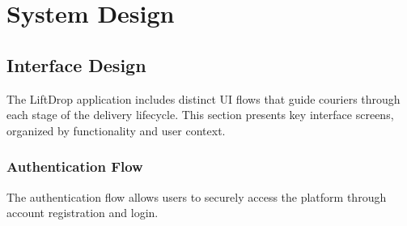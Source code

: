 \section{System Design}



\vspace{2mm}

\subsection{Interface Design}

The LiftDrop application includes distinct UI flows that guide couriers through each stage of the delivery lifecycle. This section presents key interface screens, organized by functionality and user context.


\subsubsection{Authentication Flow}

The authentication flow allows users to securely access the platform through account registration and login.

